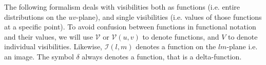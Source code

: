 \documentclass[useAMS,usenatbib]{mn2e}
\begin{document}
\newcommand{\VV}{\mathcal{V}}
\newcommand{\PP}{\mathcal{P}}
\newcommand{\VVM}{\mathcal{V}^\mathrm{M}}
\newcommand{\WW}{\mathcal{W}}
\newcommand{\II}{\mathcal{I}}
\newcommand{\IID}{\mathcal{I}^\mathrm{D}}
\newcommand{\IIDI}{\mathcal{I}^\mathrm{DI}}
\newcommand{\EE}{\mathcal{E}}
\newcommand{\FF}{\mathcal{F}}
\newcommand{\HH}{\mathcal{H}}
\newcommand{\TT}{\mathcal{T}}
\newcommand{\NN}{\mathcal{N}}
\newcommand{\uu}{\bmath{u}}
\newcommand{\Btf}{\mathsf{B}^{[\Delta t\Delta\nu]}}
\newcommand{\Babtf}{\mathsf{B}^{[\alpha\Delta t,\beta\Delta\nu]}}
\newcommand{\Bab}{\mathsf{B}^{[\alpha\beta]}}
\newcommand{\Buv}{\mathsf{B}^{[uv]}}
\newcommand{\Bij}{\mathsf{B}}
\newcommand{\Ptf}{\Pi^{[t\nu]}}
\newcommand{\Puv}{\Pi^{[uv]}}
\newcommand{\Vm}{V^\mathrm{M}}
\newcommand{\Vs}{V^\mathrm{S}}
% 
The following formalism deals with visibilities both as functions (i.e. entire distributions on the $uv$-plane), 
and single visibilities (i.e. values of those functions at a specific point). To avoid confusion between functions in
functional notation and their values, we will use $\VV$ or 
$\VV(u,v)$ to denote functions, and $V$ to denote individual visibilities. Likewise, $\II(l,m)$ denotes a function 
on the $lm$-plane i.e. an image. The symbol $\delta$ always denotes a function, that is a delta-function.
\end{document}
